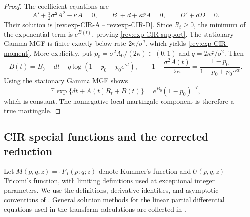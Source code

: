 \documentclass[11pt]{article}
\theoremstyle{remark}
\newcommand{\E}{\mathbb E}
\begin{document}
\begin{proof}
The coefficient equations are
\[
A'+\tfrac12\sigma^2A^2-\kappa A=0,
\qquad B'+d+\kappa\bar r A=0,
\qquad D'+dD=0.
\]
Their solution is \eqref{rev:exp-CIR-A}--\eqref{rev:exp-CIR-D}.  Since
$R_t\ge0$, the minimum of the exponential term is $e^{B(t)}$, proving
\eqref{rev:exp-CIR-support}.  The stationary Gamma MGF is finite exactly below
rate $2\kappa/\sigma^2$, which yields \eqref{rev:exp-CIR-moment}.  More
explicitly, put $p_0=\sigma^2A_0/(2\kappa)\in(0,1)$ and
$q=2\kappa\bar r/\sigma^2$.  Then
\[
B(t)=B_0-dt-q\log(1-p_0+p_0e^{\kappa t}),
\qquad
1-\frac{\sigma^2A(t)}{2\kappa}
=\frac{1-p_0}{1-p_0+p_0e^{\kappa t}}.
\]
Using the stationary Gamma MGF shows
\[
\E\exp\{dt+A(t)R_t+B(t)\}=e^{B_0}(1-p_0)^{-q},
\]
which is constant.  The nonnegative local-martingale component is therefore a
true martingale.
\end{proof}

\subsection{CIR special functions and the corrected reduction}

Let $M(p,q,z)={}_1F_1(p;q;z)$ denote Kummer's function and $U(p,q,z)$
Tricomi's function, with limiting definitions used at exceptional integer
parameters.  We use the definitions, derivative identities, and asymptotic
conventions of \citet[Chapter~13]{OlverEtAl2010}.
General solution methods for the linear partial differential equations used in
the transform calculations are collected in \citet{PolyaninNazaikinskii2015}.
\end{document}
